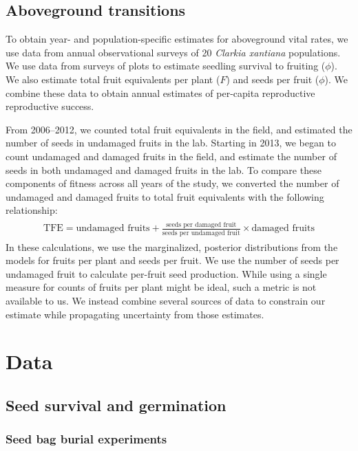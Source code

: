 \documentclass[12pt, oneside, titlepage]{article}   	%
\begin{document}
\subsection{Aboveground transitions}

To obtain year- and population-specific estimates for aboveground vital rates, we use data from annual observational surveys of 20 \textit{Clarkia xantiana} populations. We use data from surveys of plots to estimate seedling survival to fruiting ($\phi$). We also estimate total fruit equivalents per plant ($F$) and seeds per fruit ($\phi$). We combine these data to obtain annual estimates of per-capita reproductive reproductive success.

From 2006--2012, we counted total fruit equivalents in the field, and estimated the number of seeds in undamaged fruits in the lab. Starting in 2013, we began to count undamaged and damaged fruits in the field, and estimate the number of seeds in both undamaged and damaged fruits in the lab. To compare these components of fitness across all years of the study, we converted the number of undamaged and damaged fruits to total fruit equivalents with the following relationship:
%
    \begin{align}
\begin{split}
\textrm{TFE} = \textrm{undamaged fruits} + \frac{\textrm{seeds per damaged fruit}}{\textrm{seeds per undamaged fruit}}\times  \textrm{damaged fruits} 
  \end{split}
\end{align}
%
In these calculations, we use the marginalized, posterior distributions from the models for fruits per plant and seeds per fruit. We use the number of seeds per undamaged fruit to calculate per-fruit seed production. While using a single measure for counts of fruits per plant might be ideal, such a metric is not available to us. We instead combine several sources of data to constrain our estimate while propagating uncertainty from those estimates. 

\section{Data}

\subsection{Seed survival and germination}

\subsubsection{Seed bag burial experiments}
\end{document}
